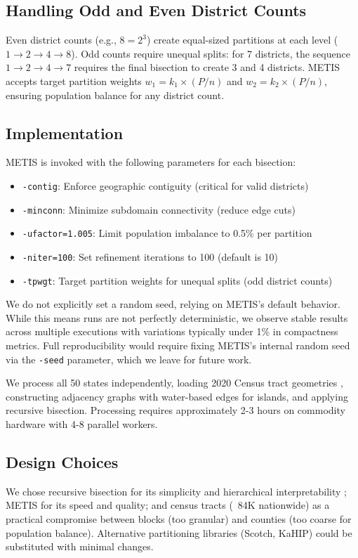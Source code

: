 \subsection{Handling Odd and Even District Counts}

Even district counts (e.g., $8 = 2^3$) create equal-sized partitions at each level ($1 \to 2 \to 4 \to 8$). Odd counts require unequal splits: for 7 districts, the sequence $1 \to 2 \to 4 \to 7$ requires the final bisection to create 3 and 4 districts. METIS accepts target partition weights $w_1 = k_1 \times (P/n)$ and $w_2 = k_2 \times (P/n)$, ensuring population balance for any district count.

\subsection{Implementation}

METIS is invoked with the following parameters for each bisection:
\begin{itemize}
    \item \texttt{-contig}: Enforce geographic contiguity (critical for valid districts)
    \item \texttt{-minconn}: Minimize subdomain connectivity (reduce edge cuts)
    \item \texttt{-ufactor=1.005}: Limit population imbalance to 0.5\% per partition
    \item \texttt{-niter=100}: Set refinement iterations to 100 (default is 10)
    \item \texttt{-tpwgt}: Target partition weights for unequal splits (odd district counts)
\end{itemize}

We do not explicitly set a random seed, relying on METIS's default behavior. While this means runs are not perfectly deterministic, we observe stable results across multiple executions with variations typically under 1\% in compactness metrics. Full reproducibility would require fixing METIS's internal random seed via the \texttt{-seed} parameter, which we leave for future work.

We process all 50 states independently, loading 2020 Census tract geometries \cite{census2020redistricting}, constructing adjacency graphs with water-based edges for islands, and applying recursive bisection. Processing requires approximately 2-3 hours on commodity hardware with 4-8 parallel workers.

\subsection{Design Choices}

We chose recursive bisection for its simplicity and hierarchical interpretability \cite{hess1965nonpartisan}; METIS for its speed and quality; and census tracts (~84K nationwide) as a practical compromise between blocks (too granular) and counties (too coarse for population balance). Alternative partitioning libraries (Scotch, KaHIP) could be substituted with minimal changes.
